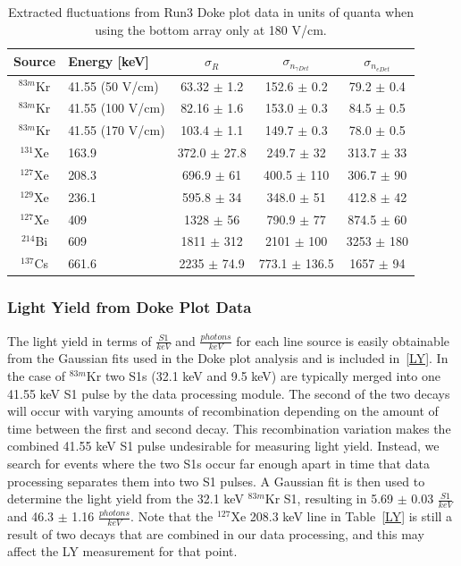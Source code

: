 \begin{center}
\begin{table}[H]
\begin{tabular}{ | c| p{40mm} | c | c | c | }
\hline
Source & Energy [keV] & $\sigma_{R}$ & $\sigma_{n_{\gamma Det}}$ & $\sigma_{n_{e Det}}$ \\ \hline
$^{83m}$Kr & 41.55 (50 V/cm) & 63.32 $\pm$ 1.2 & 152.6 $\pm$ 0.2 & 79.2 $\pm$ 0.4\\  \hline
$^{83m}$Kr & 41.55 (100 V/cm) & 82.16 $\pm$ 1.6 & 153.0 $\pm$ 0.3 & 84.5 $\pm$ 0.5\\  \hline
$^{83m}$Kr & 41.55 (170 V/cm) & 103.4 $\pm$ 1.1 & 149.7 $\pm$ 0.3 & 78.0 $\pm$ 0.5\\  \hline
$^{131}$Xe & 163.9 & 372.0 $\pm$ 27.8 & 249.7 $\pm$ 32 & 313.7 $\pm$ 33\\  \hline
$^{127}$Xe & 208.3 & 696.9 $\pm$ 61 & 400.5 $\pm$ 110 & 306.7 $\pm$ 90\\  \hline
$^{129}$Xe & 236.1 & 595.8 $\pm$ 34 & 348.0 $\pm$ 51 & 412.8 $\pm$ 42\\  \hline
$^{127}$Xe & 409 & 1328  $\pm$ 56 & 790.9 $\pm$ 77 & 874.5 $\pm$ 60\\  \hline
$^{214}$Bi & 609 & 1811 $\pm$ 312 & 2101 $\pm$ 100 & 3253 $\pm$ 180\\  \hline
$^{137}$Cs & 661.6 & 2235 $\pm$ 74.9 & 773.1 $\pm$ 136.5 & 1657 $\pm$ 94\\ 
\hline
\end{tabular}
\caption{Extracted fluctuations from Run3 Doke plot data in units of quanta when using the bottom array only at 180 V/cm.}
\label{SigRBot}
\end{table}
\end{center}


\subsubsection{Light Yield from Doke Plot Data}

The light yield in terms of $\frac{S1}{keV}$ and $\frac{photons}{keV}$ for each line source is easily obtainable from the Gaussian fits used in the Doke plot analysis and is included in~\ref{LY}.  In the case of $^{83m}$Kr two S1s (32.1 keV and 9.5 keV) are typically merged into one 41.55 keV S1 pulse by the data processing module.  The second of the two decays will occur with varying amounts of recombination depending on the amount of time between the first and second decay.  This recombination variation makes the combined 41.55 keV S1 pulse undesirable for measuring light yield.  Instead, we search for events where the two S1s occur far enough apart in time that data processing separates them into two S1 pulses.  A Gaussian fit is then used to determine the light yield from the 32.1 keV $^{83m}$Kr S1, resulting in 5.69 $\pm$ 0.03 $\frac{S1}{keV}$ and 46.3 $\pm$ 1.16 $\frac{photons}{keV}$. Note that the $^{127}$Xe 208.3 keV line in Table~\ref{LY} is still a result of two decays that are combined in our data processing, and this may affect the LY measurement for that point.

